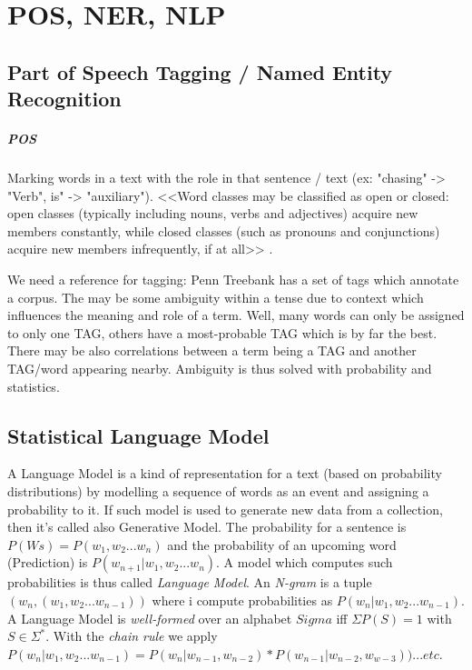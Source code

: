 \chapter{POS, NER, NLP}

\section{Part of Speech Tagging / Named Entity Recognition}

\paragraph{POS}

Marking words in a text with the role in that sentence / text (ex: "chasing" -> "Verb", is" -> "auxiliary").
<<Word classes may be classified as open or closed: open classes (typically including nouns, verbs and adjectives) acquire new members constantly, while closed classes (such as pronouns and conjunctions) acquire new members infrequently, if at all>> \cite{enwiki:1251632448}.

We need a reference for tagging: Penn Treebank has a set of tags which annotate a corpus.
The may be some ambiguity within a tense due to context which influences the meaning and role of a term.
Well, many words can only be assigned to only one TAG, others have a most-probable TAG which is by far the best.
There may be also correlations between a term being a TAG and another TAG/word appearing nearby.
Ambiguity is thus solved with probability and statistics.

\section{Statistical Language Model}

A Language Model is a kind of representation for a text (based on probability distributions) by modelling a sequence of words as an event and assigning a probability to it. If such model is used to generate new data from a collection, then it's called also Generative Model.
The probability for a sentence is $P(Ws) = P(w_1,w_2...w_n)$ and the probability of an upcoming word (Prediction) is $P(w_{n+1}|w_1,w_2...w_n)$. A model which computes such probabilities is thus called \emph{Language Model}.
An \emph{N-gram} is a tuple $(w_n, (w_1, w_2 ... w_{n-1}))$ where i compute probabilities as $P(w_n|w_1, w_2 ... w_{n-1})$.
A Language Model is \emph{well-formed} over an alphabet $Sigma$ iff $\Sigma P(S) = 1$ with $S \in \Sigma^{*}$.
With the \emph{chain rule} we apply $P(w_n|w_1, w_2 ... w_{n-1}) = P(w_n|w_{n-1}, w_{n-2}) * P(w_{n-1}|w_{n-2},w_{w-3})) ... etc$.

